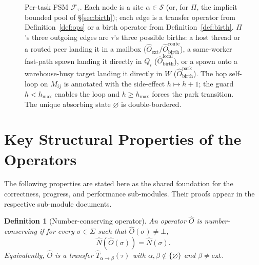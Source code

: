 \documentclass[11pt,a4paper]{report}
\newtheorem{definition}{Definition}[section]
\newcommand{\Num}{\hat{N}}
\newcommand{\Trf}[2]{\hat{T}_{#1 \to #2}}
\begin{document}
\begin{figure}[H]
\caption{Per-task FSM $\mathcal{F}_\tau$.  Each node is a site
$\alpha \in \mathcal{S}$ (or, for $\Pi$, the implicit bounded pool of
\S\ref{sec:birth}); each edge is a transfer operator from
Definition~\ref{def:ops} or a birth operator from
Definition~\ref{def:birth}. $\Pi$'s three outgoing edges are $\tau$'s
three possible births: a host thread or a routed peer landing it in a
mailbox ($\hat{O}_{\text{ext}}/\hat{O}_{\text{birth}}^{\text{route}}$),
a same-worker fast-path spawn landing it directly in $Q_i$
($\hat{O}_{\text{birth}}^{\text{local}}$), or a spawn onto a
warehouse-busy target landing it directly in $W$
($\hat{O}_{\text{birth}}^{\text{park}}$). The hop self-loop on $M_{ij}$
is annotated with the side-effect $h \mapsto h+1$; the guard
$h < h_{\max}$ enables the loop and $h \geq h_{\max}$ forces the
park transition.  The unique absorbing state $\varnothing$ is
double-bordered.}
\label{fig:fsm-task}
\end{figure}

\section{Key Structural Properties of the Operators}

The following properties are stated here as the shared foundation
for the correctness, progress, and performance sub-modules.  Their
proofs appear in the respective sub-module documents.

\begin{definition}[Number-conserving operator]
\label{def:conserving}
An operator $\hat{O}$ is \emph{number-conserving} if for every
$\sigma \in \Sigma$ such that $\hat{O}(\sigma) \neq \bot$,
\[
  \Num(\hat{O}(\sigma)) = \Num(\sigma).
\]
Equivalently, $\hat{O}$ is a transfer $\Trf{\alpha}{\beta}(\tau)$ with
$\alpha, \beta \notin \{\varnothing\}$ and $\beta \neq \text{ext}$.
\end{definition}
\end{document}
